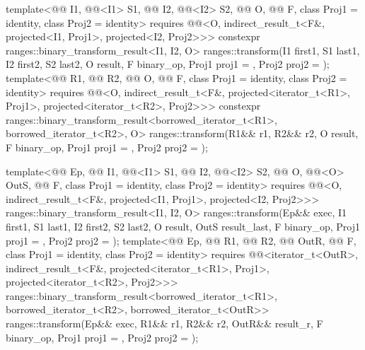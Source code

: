 \begin{itemdecl}
template<@@ I1, @@<I1> S1, @@ I2, @@<I2> S2,
         @@ O, @@ F, class Proj1 = identity,
         class Proj2 = identity>
  requires @@<O, indirect_result_t<F&, projected<I1, Proj1>,
                               projected<I2, Proj2>>>
  constexpr ranges::binary_transform_result<I1, I2, O>
    ranges::transform(I1 first1, S1 last1, I2 first2, S2 last2, O result,
                      F binary_op, Proj1 proj1 = {}, Proj2 proj2 = {});
template<@@ R1, @@ R2, @@ O,
         @@ F, class Proj1 = identity, class Proj2 = identity>
  requires @@<O, indirect_result_t<F&, projected<iterator_t<R1>, Proj1>,
                               projected<iterator_t<R2>, Proj2>>>
  constexpr ranges::binary_transform_result<borrowed_iterator_t<R1>, borrowed_iterator_t<R2>, O>
    ranges::transform(R1&& r1, R2&& r2, O result,
                      F binary_op, Proj1 proj1 = {}, Proj2 proj2 = {});

template<@@ Ep, @@ I1, @@<I1> S1,
         @@ I2, @@<I2> S2,
         @@ O, @@<O> OutS,
         @@ F, class Proj1 = identity, class Proj2 = identity>
  requires @@<O, indirect_result_t<F&, projected<I1, Proj1>,
                                projected<I2, Proj2>>>
  ranges::binary_transform_result<I1, I2, O>
    ranges::transform(Ep&& exec, I1 first1, S1 last1, I2 first2, S2 last2,
                      O result, OutS result_last,
                      F binary_op, Proj1 proj1 = {}, Proj2 proj2 = {});
template<@@ Ep, @@ R1, @@ R2,
         @@ OutR, @@ F,
          class Proj1 = identity, class Proj2 = identity>
  requires @@<iterator_t<OutR>,
                                indirect_result_t<F&, projected<iterator_t<R1>, Proj1>,
                                projected<iterator_t<R2>, Proj2>>>
  ranges::binary_transform_result<borrowed_iterator_t<R1>, borrowed_iterator_t<R2>,
                                  borrowed_iterator_t<OutR>>
    ranges::transform(Ep&& exec, R1&& r1, R2&& r2, OutR&& result_r,
                      F binary_op, Proj1 proj1 = {}, Proj2 proj2 = {});
\end{itemdecl}


